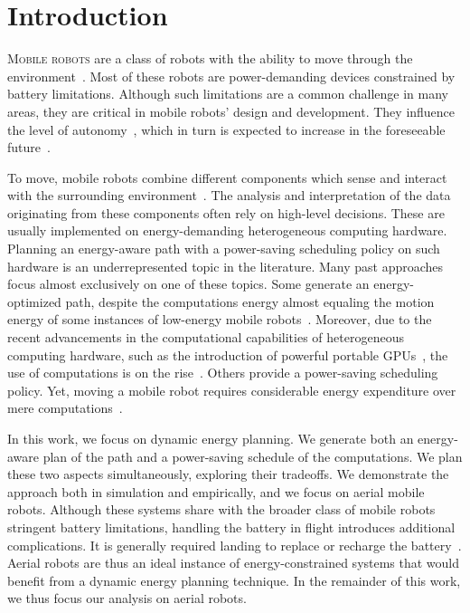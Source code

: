 
\chapter{Introduction}
\label{cp:intro}


\lettrine{M}{obile robots} are a class of robots with the ability to move through the environment~\citep{corke2017robotics}. Most of these robots are power-demanding devices constrained by battery limitations. Although such limitations are a common challenge in many areas, they are critical in mobile robots' design and development. They influence the level of autonomy~\citep{seewald2020mechanical}, which in turn is expected to increase in the foreseeable future~\citep{fisher2013verifying}.

To move, mobile robots combine different components which sense and interact with the surrounding environment~\citep{mei2006deployment}. The analysis and interpretation of the data originating from these components often rely on high-level decisions. These are usually implemented on energy-demanding heterogeneous computing hardware. Planning an energy-aware path with a power-saving scheduling policy on such hardware is an underrepresented topic in the literature. Many past approaches focus almost exclusively on one of these topics. Some generate an energy-optimized path, despite the computations energy almost equaling the motion energy of some instances of low-energy mobile robots~\citep{sudhakar2020balancing}. Moreover, due to the recent advancements in the computational capabilities of heterogeneous computing hardware, such as the introduction of powerful portable GPUs~\citep{rizvi2017general}, the use of computations is on the rise~\citep{abramov2012real,satria2016real,jaramillo2019visual}. Others provide a power-saving scheduling policy. Yet, moving a mobile robot requires considerable energy expenditure over mere computations~\citep{mei2004energy,mei2005case}.

In this work, we focus on dynamic energy planning. We generate both an energy-aware plan of the path and a power-saving schedule of the computations. We plan these two aspects simultaneously, exploring their tradeoffs. We demonstrate the approach both in simulation and empirically, and we focus on aerial mobile robots. Although these systems share with the broader class of mobile robots stringent battery limitations, handling the battery in flight introduces additional complications. It is generally required landing to replace or recharge the battery~\citep{zamanakos2020energy}. Aerial robots are thus an ideal instance of energy-constrained systems that would benefit from a dynamic energy planning technique. In the remainder of this work, we thus focus our analysis on aerial robots.

